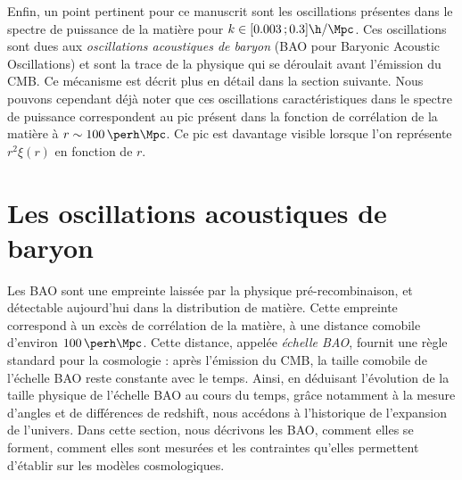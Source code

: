 \documentclass[11pt, twoside, a4paper, openright]{report}
\begin{document}
Enfin, un point pertinent pour ce manuscrit sont les oscillations présentes dans le spectre de puissance de la matière pour $k \in [\num{0.003} \,; \num{0.3}] \si{\h\per\Mpc}$. Ces oscillations sont dues aux \emph{oscillations acoustiques de baryon} (BAO pour Baryonic Acoustic Oscillations) et sont la trace de la physique qui se déroulait avant l'émission du CMB. Ce mécanisme est décrit plus en détail dans la section suivante. Nous pouvons cependant déjà noter que ces oscillations caractéristiques dans le spectre de puissance correspondent au pic présent dans la fonction de corrélation de la matière à $r \sim \SI{100}{\perh\Mpc}$. Ce pic est davantage visible lorsque l'on représente $r^2\xi(r)$ en fonction de $r$.

\section{Les oscillations acoustiques de baryon}
\label{sec:bao}
Les BAO sont une empreinte laissée par la physique pré-recombinaison, et détectable aujourd'hui dans la distribution de matière. Cette empreinte correspond à un excès de corrélation de la matière, à une distance comobile d'environ $\SI{100}{\perh\Mpc}$. Cette distance, appelée \emph{échelle BAO}, fournit une règle standard pour la cosmologie : après l'émission du CMB, la taille comobile de l'échelle BAO reste constante avec le temps.
Ainsi, en déduisant l'évolution de la taille physique de l'échelle BAO au cours du temps, grâce notamment à la mesure d'angles et de différences de redshift, nous accédons à l'historique de l'expansion de l'univers.
Dans cette section, nous décrivons les BAO, comment elles se forment, comment elles sont mesurées et les contraintes qu'elles permettent d'établir sur les modèles cosmologiques.
\end{document}
